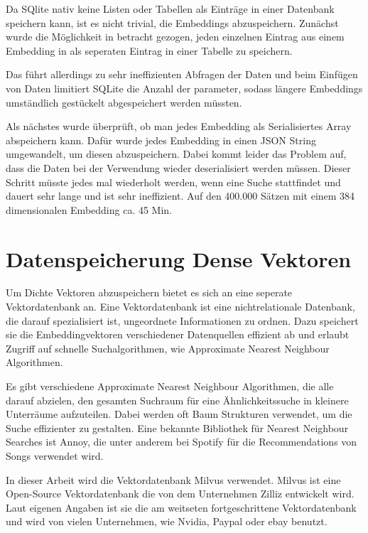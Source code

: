 Da SQlite nativ keine Listen oder Tabellen als Einträge in einer Datenbank speichern kann, ist es nicht trivial, die Embeddings abzuspeichern.
Zunächst wurde die Möglichkeit in betracht gezogen, jeden einzelnen Eintrag aus einem Embedding in als seperaten Eintrag in einer Tabelle zu speichern. 

Das führt allerdings zu sehr ineffizienten Abfragen der Daten und beim Einfügen von Daten limitiert SQLite die Anzahl der parameter, sodass längere Embeddings umständlich gestückelt abgespeichert werden müssten.

Als nächstes wurde überprüft, ob man jedes Embedding als Serialisiertes Array abspeichern kann.
Dafür wurde jedes Embedding in einen JSON String umgewandelt, um diesen abzuspeichern. 
Dabei kommt leider das Problem auf, dass die Daten bei der Verwendung wieder deserialisiert werden müssen.
Dieser Schritt müsste jedes mal wiederholt werden, wenn eine Suche stattfindet und dauert sehr lange und ist sehr ineffizient. 
Auf den 400.000 Sätzen mit einem 384 dimensionalen Embedding ca. 45 Min.


\section{Datenspeicherung Dense Vektoren}

Um Dichte Vektoren abzuspeichern bietet es sich an eine seperate Vektordatenbank an.
Eine Vektordatenbank ist eine nichtrelationale Datenbank, die darauf spezialisiert ist, ungeordnete Informationen zu ordnen.
Dazu speichert sie die Embeddingvektoren verschiedener Datenquellen effizient ab und erlaubt Zugriff auf schnelle Suchalgorithmen, wie Approximate Nearest Neighbour Algorithmen.

Es gibt verschiedene Approximate Nearest Neighbour Algorithmen, die alle darauf abzielen, den gesamten Suchraum für eine Ähnlichkeitssuche in kleinere Unterräume aufzuteilen.
Dabei werden oft Baum Strukturen verwendet, um die Suche effizienter zu gestalten.
Eine bekannte Bibliothek für Nearest Neighbour Searches ist Annoy, die unter anderem bei Spotify für die Recommendations von Songs verwendet wird.


In dieser Arbeit wird die Vektordatenbank Milvus verwendet.
Milvus ist eine Open-Source Vektordatenbank die von dem Unternehmen Zilliz entwickelt wird.
Laut eigenen Angaben ist sie die am weitseten fortgeschrittene Vektordatenbank und wird von vielen Unternehmen, wie Nvidia, Paypal oder ebay benutzt.




